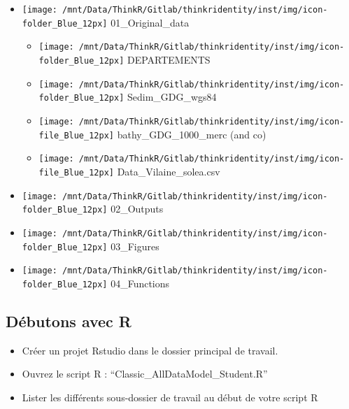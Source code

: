 \documentclass[french,a4paper]{article}
\providecommand{\tightlist}{%
  \setlength{\itemsep}{0pt}\setlength{\parskip}{0pt}}
\begin{document}
\begin{itemize}
\tightlist
\item
  \texttt{[image: /mnt/Data/ThinkR/Gitlab/thinkridentity/inst/img/icon-folder\_Blue\_12px]} 01\_Original\_data

  \begin{itemize}
  \tightlist
  \item
    \texttt{[image: /mnt/Data/ThinkR/Gitlab/thinkridentity/inst/img/icon-folder\_Blue\_12px]} DEPARTEMENTS
  \item
    \texttt{[image: /mnt/Data/ThinkR/Gitlab/thinkridentity/inst/img/icon-folder\_Blue\_12px]} Sedim\_GDG\_wgs84
  \item
    \texttt{[image: /mnt/Data/ThinkR/Gitlab/thinkridentity/inst/img/icon-file\_Blue\_12px]} bathy\_GDG\_1000\_merc (and co)
  \item
    \texttt{[image: /mnt/Data/ThinkR/Gitlab/thinkridentity/inst/img/icon-file\_Blue\_12px]} Data\_Vilaine\_solea.csv
  \end{itemize}
\item
  \texttt{[image: /mnt/Data/ThinkR/Gitlab/thinkridentity/inst/img/icon-folder\_Blue\_12px]} 02\_Outputs
\item
  \texttt{[image: /mnt/Data/ThinkR/Gitlab/thinkridentity/inst/img/icon-folder\_Blue\_12px]} 03\_Figures
\item
  \texttt{[image: /mnt/Data/ThinkR/Gitlab/thinkridentity/inst/img/icon-folder\_Blue\_12px]} 04\_Functions
\end{itemize}

\hypertarget{debutons-avec-r}{%
\subsection{Débutons avec R}\label{debutons-avec-r}}

\begin{itemize}
\tightlist
\item
  Créer un projet Rstudio dans le dossier principal de travail.
\item
  Ouvrez le script R : ``Classic\_AllDataModel\_Student.R''
\item
  Lister les différents sous-dossier de travail au début de votre script R
\end{itemize}
\end{document}
